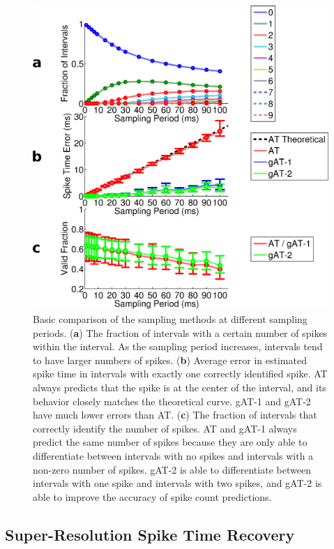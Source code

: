 \documentclass[10 pt]{article}
\begin{document}
\begin{figure}[htbp]
\begin{center}
\includegraphics[scale=0.40]{basic_comparison.eps}
\caption{Basic comparison of the sampling methods at different sampling periods. (\textbf{a}) The fraction of intervals with a certain number of spikes within the interval. As the sampling period increases, intervals tend to have larger numbers of spikes. (\textbf{b}) Average error in estimated spike time in intervals with exactly one correctly identified spike. AT always predicts that the spike is at the center of the interval, and its behavior closely matches the theoretical curve. gAT-1 and gAT-2 have much lower errors than AT. (\textbf{c}) The fraction of intervals that correctly identify the number of spikes. AT and gAT-1 always predict the same number of spikes because they are only able to differentiate between intervals with no spikes and intervals with a non-zero number of spikes. gAT-2 is able to differentiate between intervals with one spike and intervals with two spikes, and gAT-2 is able to improve the accuracy of spike count predictions.}
\label{fig:basic_comparison}
\end{center}
\end{figure}

\subsection{Super-Resolution Spike Time Recovery}
\end{document}
